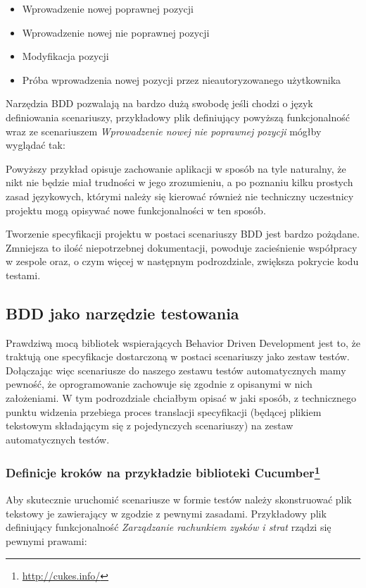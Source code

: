       \begin{itemize}
        \item Wprowadzenie nowej poprawnej pozycji
        \item Wprowadzenie nowej nie poprawnej pozycji
        \item Modyfikacja pozycji
        \item Próba wprowadzenia nowej pozycji przez nieautoryzowanego użytkownika
      \end{itemize}
      
      Narzędzia BDD pozwalają na bardzo dużą swobodę jeśli chodzi o język definiowania scenariuszy, przykładowy plik definiujący powyższą funkcjonalność wraz ze scenariuszem \emph{Wprowadzenie nowej nie poprawnej pozycji} mógłby wyglądać tak:
      


    Powyższy przykład opisuje zachowanie aplikacji w sposób na tyle naturalny, że nikt nie będzie miał trudności w jego zrozumieniu, a po poznaniu kilku prostych zasad językowych, którymi należy się kierować również nie techniczny uczestnicy projektu mogą opisywać nowe funkcjonalności w ten sposób.
    
    Tworzenie specyfikacji projektu w postaci scenariuszy BDD jest bardzo pożądane. Zmniejsza to ilość niepotrzebnej dokumentacji, powoduje zacieśnienie współpracy w zespole oraz, o czym więcej w następnym podrozdziale, zwiększa pokrycie kodu testami.
    
    \subsection{BDD jako narzędzie testowania}
      Prawdziwą mocą bibliotek wspierających Behavior Driven Development jest to, że traktują one specyfikacje dostarczoną w postaci scenariuszy jako zestaw testów. Dołączając więc scenariusze do naszego zestawu testów automatycznych mamy pewność, że oprogramowanie zachowuje się zgodnie z opisanymi w nich założeniami. W tym podrozdziale chciałbym opisać w jaki sposób, z technicznego punktu widzenia przebiega proces translacji specyfikacji (będącej plikiem tekstowym składającym się z pojedynczych scenariuszy) na zestaw automatycznych testów.
      \subsubsection[Definicje kroków na przykładzie biblioteki Cucumber]{Definicje kroków na przykładzie biblioteki Cucumber\footnote{\url{http://cukes.info/}\nocite{cucumber}}}
        Aby skutecznie uruchomić scenariusze w formie testów należy skonstruować plik tekstowy je zawierający w zgodzie z pewnymi zasadami. Przykładowy plik definiujący funkcjonalność \emph{Zarządzanie rachunkiem zysków i strat} rządzi się pewnymi prawami:
        
